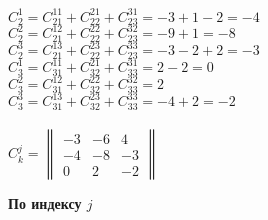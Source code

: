 \documentclass{article}
\begin{document}
\begin{multicols}{2}
\begin{center}
$C^{1}_{2} = C^{11}_{21} + C^{21}_{22} + C^{31}_{23} = -3 +1 -2 = -4$ \\
$C^{2}_{2} = C^{12}_{21} + C^{22}_{22} + C^{32}_{23} = -9 +1 = -8$ \\
$C^{3}_{2} = C^{13}_{21} + C^{23}_{22} + C^{33}_{23} = -3 -2 +2 = -3$ \\
$C^{1}_{3} = C^{11}_{31} + C^{21}_{32} + C^{31}_{33} = 2 -2 = 0$ \\
$C^{2}_{3} = C^{12}_{31} + C^{22}_{32} + C^{32}_{33} = 2$ \\
$C^{3}_{3} = C^{13}_{31} + C^{23}_{32} + C^{33}_{33} = -4 +2 = -2$ \\ \, \\
$C^{j}_{k} = \begin{Vmatrix}-3 & -6 & 4 \\ -4 & -8 & -3 \\ 0 & 2 & -2\end{Vmatrix}$
\end{center}
\end{multicols}
\pagebreak
\begin{center}
\textbf{По индексу $j$}
\end{center}
\end{document}
